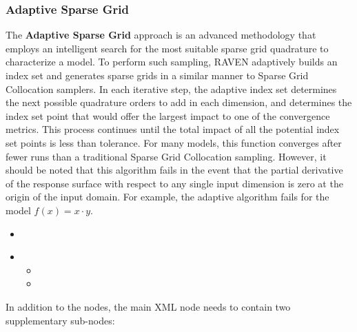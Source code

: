 \subsubsection{Adaptive Sparse Grid}
\label{subsubsubsec:AdaptiveSparseGrid}
The \textbf{Adaptive Sparse Grid} approach is an advanced methodology that employs
an intelligent search for the most suitable sparse grid quadrature to characterize a model.
%
To perform such sampling, RAVEN adaptively builds an index set and generates sparse grids
in a similar manner to Sparse Grid Collocation samplers.  In each iterative step, the adaptive
index set determines the next possible quadrature orders to add in each dimension, and
determines the index set point that would offer the largest impact to one of the convergence
metrics.  This process continues until the total impact of all the potential index set points is
less than tolerance.  For many models, this function converges after fewer runs than a traditional
Sparse Grid Collocation sampling.  However, it should be noted that this algorithm fails
in the event that the partial derivative of the response surface with respect to any single
input dimension is zero at the origin of the input domain.  For example, the adaptive
algorithm fails for the model $f(x)=x\cdot y$.
%

%
\attrIntro

\begin{itemize}
  \itemsep0em
  \item \nameDescription
\end{itemize}


\begin{itemize}
  \item \variableDescription
    \variableChildrenIntro
    \begin{itemize}
      \item \distributionDescription
    \item \functionDescription
    \end{itemize}
\end{itemize}

In addition to the  nodes, the main XML node
 needs to contain two supplementary sub-nodes:

